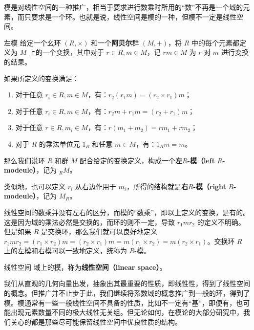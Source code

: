 

模是对线性空间的一种推广，相当于要求进行数乘时所用的“数”不再是一个域的元素，而只要求是一个环。也就是说，线性空间是模的一种，但模不一定是线性空间。

\begin{definition}{左模}
给定一个幺环 $(R, \times)$ 和一个\textbf{阿贝尔}群 $(M, +)$，将 $R$ 中的每个元素都定义为 $M$ 上的一个变换，其中对于 $r\in R, m\in M$，记 $rm\in M$ 为 $r$ 对 $m$ 进行变换的结果。

如果所定义的变换满足：
\begin{enumerate}
\item 对于任意 $r_i\in R, m\in M$，有：$r_2(r_1m)=(r_2\times r_1)m$；
\item 对于任意 $r_i\in R, m\in M$，有：$r_2m+r_1m=(r_2+r_1)m$；
\item 对于任意 $r\in R, m_i\in M$，有：$r(m_1+m_2)=rm_1+rm_2$；
\item 对于 $R$ 的乘法单位元 $1_R$ 和任意 $m\in M$，有：$1_Rm=m$。
\end{enumerate}

那么我们说环 $R$ 和群 $M$ 配合给定的变换定义，构成一个\textbf{左}$R$\textbf{-模（left} $R$\textbf{-modeule）}，记为 $_RM$。
\end{definition}

类似地，也可以定义 $r_i$ 从右边作用于 $m_i$，所得的结构就是\textbf{右}$R$\textbf{-模（right} $R$\textbf{-modeule）}，记为 $M_R$。

线性空间的数乘并没有左右的区分，而模的“数乘”，即以上定义的变换，是有的。这是因为域的乘法必然是交换的，而环的则不一定，导致 $r_1mr_2$ 的定义不明确。但是如果 $R$ 是交换环，那么我们就可以良好地定义 $r_1mr_2=(r_1\times r_2)m=(r_2\times r_1)m=m(r_1\times r_2)=m(r_2\times r_1)$。交换环 $R$ 上的左模和右模可以一致地定义，统称为 $R$-模。

\begin{definition}{线性空间}
域上的模，称为\textbf{线性空间（linear space）}。
\end{definition}


我们从直观的几何向量出发，抽象出其最重要的性质，即线性性，得到了线性空间的概念。但推广并不止步于此，我们继续将系数域的概念推广到一般的环，得到了模。模通常有一些一般线性空间不具备的性质，比如不一定有“基”，即便有，也可能出现元素数量不同的极大线性无关组。但无论如何，在模论的大部分研究中，我们关心的都是那些尽可能保留线性空间中优良性质的结构。


